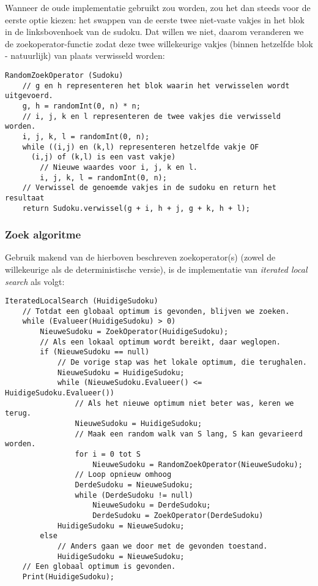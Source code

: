 \documentclass[]{report}
\begin{document}
Wanneer de oude implementatie gebruikt zou worden, zou het dan steeds voor de eerste optie kiezen: het swappen van de eerste twee niet-vaste vakjes in het blok in de linksbovenhoek van de sudoku. Dat willen we niet, daarom veranderen we de zoekoperator-functie zodat deze twee willekeurige vakjes (binnen hetzelfde blok - natuurlijk) van plaats verwisseld worden:

\begin{minipage}{\textwidth}
\begin{lstlisting}
RandomZoekOperator (Sudoku)
	// g en h representeren het blok waarin het verwisselen wordt uitgevoerd.
	g, h = randomInt(0, n) * n;
	// i, j, k en l representeren de twee vakjes die verwisseld worden.
	i, j, k, l = randomInt(0, n);
	while ((i,j) en (k,l) representeren hetzelfde vakje OF
	  (i,j) of (k,l) is een vast vakje)
		// Nieuwe waardes voor i, j, k en l.
		i, j, k, l = randomInt(0, n);
	// Verwissel de genoemde vakjes in de sudoku en return het resultaat
	return Sudoku.verwissel(g + i, h + j, g + k, h + l);
\end{lstlisting}
\end{minipage}

\subsubsection{Zoek algoritme}
Gebruik makend van de hierboven beschreven zoekoperator(s) (zowel de willekeurige als de deterministische versie), is de implementatie van \textit{iterated local search} als volgt:

\begin{minipage}{\textwidth}
\begin{lstlisting}
IteratedLocalSearch (HuidigeSudoku)
	// Totdat een globaal optimum is gevonden, blijven we zoeken.
	while (Evalueer(HuidigeSudoku) > 0)
		NieuweSudoku = ZoekOperator(HuidigeSudoku);
		// Als een lokaal optimum wordt bereikt, daar weglopen.
		if (NieuweSudoku == null)
			// De vorige stap was het lokale optimum, die terughalen.
			NieuweSudoku = HuidigeSudoku;
			while (NieuweSudoku.Evalueer() <= HuidigeSudoku.Evalueer())
				// Als het nieuwe optimum niet beter was, keren we terug.
				NieuweSudoku = HuidigeSudoku; 
				// Maak een random walk van S lang, S kan gevarieerd worden.
				for i = 0 tot S
					NieuweSudoku = RandomZoekOperator(NieuweSudoku);
				// Loop opnieuw omhoog
				DerdeSudoku = NieuweSudoku; 
				while (DerdeSudoku != null)
					NieuweSudoku = DerdeSudoku;
					DerdeSudoku = ZoekOperator(DerdeSudoku)
			HuidigeSudoku = NieuweSudoku;
		else 
			// Anders gaan we door met de gevonden toestand.
			HuidigeSudoku = NieuweSudoku;
	// Een globaal optimum is gevonden.
	Print(HuidigeSudoku);
\end{lstlisting}
\end{minipage}
\end{document}
